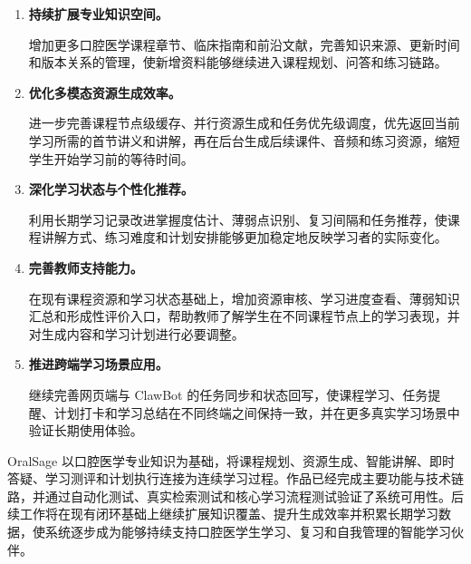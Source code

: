 \begin{enumerate}
  \item \textbf{持续扩展专业知识空间。}

  增加更多口腔医学课程章节、临床指南和前沿文献，完善知识来源、更新时间和版本关系的管理，使新增资料能够继续进入课程规划、问答和练习链路。

  \item \textbf{优化多模态资源生成效率。}

  进一步完善课程节点级缓存、并行资源生成和任务优先级调度，优先返回当前学习所需的首节讲义和讲解，再在后台生成后续课件、音频和练习资源，缩短学生开始学习前的等待时间。

  \item \textbf{深化学习状态与个性化推荐。}

  利用长期学习记录改进掌握度估计、薄弱点识别、复习间隔和任务推荐，使课程讲解方式、练习难度和计划安排能够更加稳定地反映学习者的实际变化。

  \item \textbf{完善教师支持能力。}

  在现有课程资源和学习状态基础上，增加资源审核、学习进度查看、薄弱知识汇总和形成性评价入口，帮助教师了解学生在不同课程节点上的学习表现，并对生成内容和学习计划进行必要调整。

  \item \textbf{推进跨端学习场景应用。}

  继续完善网页端与 ClawBot 的任务同步和状态回写，使课程学习、任务提醒、计划打卡和学习总结在不同终端之间保持一致，并在更多真实学习场景中验证长期使用体验。
\end{enumerate}

OralSage 以口腔医学专业知识为基础，将课程规划、资源生成、智能讲解、即时答疑、学习测评和计划执行连接为连续学习过程。作品已经完成主要功能与技术链路，并通过自动化测试、真实检索测试和核心学习流程测试验证了系统可用性。后续工作将在现有闭环基础上继续扩展知识覆盖、提升生成效率并积累长期学习数据，使系统逐步成为能够持续支持口腔医学生学习、复习和自我管理的智能学习伙伴。

